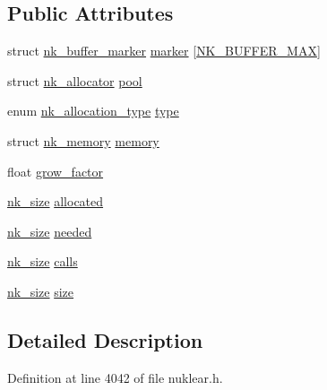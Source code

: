 \subsection*{Public Attributes}
\begin{DoxyCompactItemize}
\item 
struct \mbox{\hyperlink{structnk__buffer__marker}{nk\+\_\+buffer\+\_\+marker}} \mbox{\hyperlink{structnk__buffer_aaa4beec86444feb7908aad98c20b6849}{marker}} \mbox{[}\mbox{\hyperlink{nuklear_8h_add31ad7a49e91bcf491614a4739108c1ab0dfe51211ba806cb36a3a6b1f3e76bd}{N\+K\+\_\+\+B\+U\+F\+F\+E\+R\+\_\+\+M\+AX}}\mbox{]}
\item 
struct \mbox{\hyperlink{structnk__allocator}{nk\+\_\+allocator}} \mbox{\hyperlink{structnk__buffer_a0cd2b90bb2994190fa1aa0e9ffbc1184}{pool}}
\item 
enum \mbox{\hyperlink{nuklear_8h_aa988e58afebdfa0bbd380ed643f913ec}{nk\+\_\+allocation\+\_\+type}} \mbox{\hyperlink{structnk__buffer_a3842a03554db557944e84bc5af61249e}{type}}
\item 
struct \mbox{\hyperlink{structnk__memory}{nk\+\_\+memory}} \mbox{\hyperlink{structnk__buffer_a228b585debec1d328859fb52080ca3fd}{memory}}
\item 
float \mbox{\hyperlink{structnk__buffer_ab4ec59165f6aa6e9358bced8070cc84e}{grow\+\_\+factor}}
\item 
\mbox{\hyperlink{nuklear_8h_a84c0fc50dec5501be327b33d41d9010c}{nk\+\_\+size}} \mbox{\hyperlink{structnk__buffer_a91e9be62aa08687400bc00059825de02}{allocated}}
\item 
\mbox{\hyperlink{nuklear_8h_a84c0fc50dec5501be327b33d41d9010c}{nk\+\_\+size}} \mbox{\hyperlink{structnk__buffer_a6b0ea49209eaba5285b715d902c5f446}{needed}}
\item 
\mbox{\hyperlink{nuklear_8h_a84c0fc50dec5501be327b33d41d9010c}{nk\+\_\+size}} \mbox{\hyperlink{structnk__buffer_acd962a6e042a8ffabac679768e4851bb}{calls}}
\item 
\mbox{\hyperlink{nuklear_8h_a84c0fc50dec5501be327b33d41d9010c}{nk\+\_\+size}} \mbox{\hyperlink{structnk__buffer_a71e66eb6dad2c5827e363f2389ad4505}{size}}
\end{DoxyCompactItemize}


\subsection{Detailed Description}


Definition at line 4042 of file nuklear.\+h.



